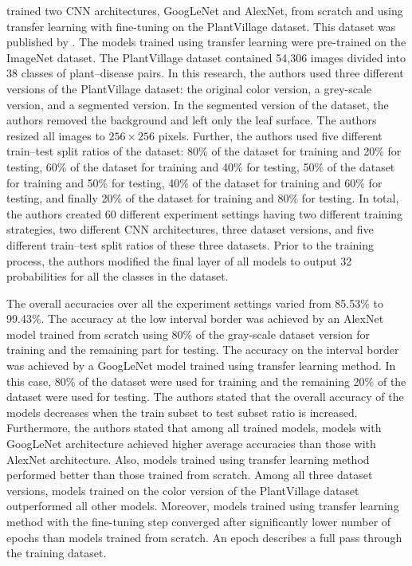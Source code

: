 \documentclass{BachelorBUI}
\begin{document}
        \textcite{Mohanty:2016} trained two CNN architectures, GoogLeNet and AlexNet, from scratch and using transfer learning with fine-tuning on the PlantVillage dataset. This dataset was published by \textcite{Hughes:2015}. The models trained using transfer learning were pre-trained on the ImageNet dataset. The PlantVillage dataset contained 54,306 images divided into 38 classes of plant--disease pairs. In this research, the authors used three different versions of the PlantVillage dataset: the original color version, a grey-scale version, and a segmented version. In the segmented version of the dataset, the authors removed the background and left only the leaf surface. The authors resized all images to $256 \times 256$ pixels. Further, the authors used five different train--test split ratios of the dataset: 80\% of the dataset for training and 20\% for testing, 60\% of the dataset for training and 40\% for testing, 50\% of the dataset for training and 50\% for testing, 40\% of the dataset for training and 60\% for testing, and finally 20\% of the dataset for training and 80\% for testing. In total, the authors created 60 different experiment settings having two different training strategies, two different CNN architectures, three dataset versions, and five different train--test split ratios of these three datasets. Prior to the training process, the authors modified the final layer of all models to output 32 probabilities for all the classes in the dataset.

        The overall accuracies over all the experiment settings varied from 85.53\% to 99.43\%. The accuracy at the low interval border was achieved by an AlexNet model trained from scratch using 80\% of the gray-scale dataset version for training and the remaining part for testing. The accuracy on the interval border was achieved by a GoogLeNet model trained using transfer learning method. In this case, 80\% of the dataset were used for training and the remaining 20\% of the dataset were used for testing. The authors stated that the overall accuracy of the models decreases when the train subset to test subset ratio is increased. Furthermore, the authors stated that among all trained models, models with GoogLeNet architecture achieved higher average accuracies than those with AlexNet architecture. Also, models trained using transfer learning method performed better than those trained from scratch. Among all three dataset versions, models trained on the color version of the PlantVillage dataset outperformed all other models. Moreover, models trained using transfer learning method with the fine-tuning step converged after significantly lower number of epochs than models trained from scratch. An epoch describes a full pass through the training dataset.
\end{document}
